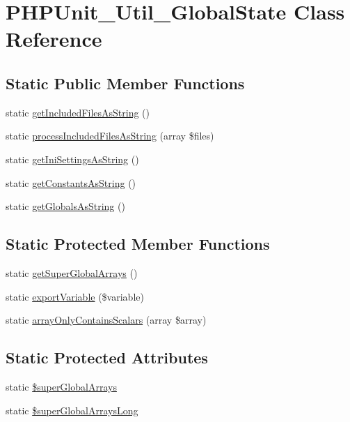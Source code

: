 \hypertarget{class_p_h_p_unit___util___global_state}{}\section{P\+H\+P\+Unit\+\_\+\+Util\+\_\+\+Global\+State Class Reference}
\label{class_p_h_p_unit___util___global_state}
\subsection*{Static Public Member Functions}
\begin{DoxyCompactItemize}
\item 
static \mbox{\hyperlink{class_p_h_p_unit___util___global_state_abc27fa88baf584e0a34b6529f397f290}{get\+Included\+Files\+As\+String}} ()
\item 
static \mbox{\hyperlink{class_p_h_p_unit___util___global_state_a90e12f63ce3df81a029a462cc0b01ddf}{process\+Included\+Files\+As\+String}} (array \$files)
\item 
static \mbox{\hyperlink{class_p_h_p_unit___util___global_state_afb71e18e570bbe1896653880bff7db6d}{get\+Ini\+Settings\+As\+String}} ()
\item 
static \mbox{\hyperlink{class_p_h_p_unit___util___global_state_ae53dadd0f7682fac99d4882017936caa}{get\+Constants\+As\+String}} ()
\item 
static \mbox{\hyperlink{class_p_h_p_unit___util___global_state_a54b637f53d26c8b49f86c515d0673159}{get\+Globals\+As\+String}} ()
\end{DoxyCompactItemize}
\subsection*{Static Protected Member Functions}
\begin{DoxyCompactItemize}
\item 
static \mbox{\hyperlink{class_p_h_p_unit___util___global_state_a0f75e557fb425f0a8d188e947444673d}{get\+Super\+Global\+Arrays}} ()
\item 
static \mbox{\hyperlink{class_p_h_p_unit___util___global_state_ac031d17b391eb264a00d30b0ca8f094e}{export\+Variable}} (\$variable)
\item 
static \mbox{\hyperlink{class_p_h_p_unit___util___global_state_ac49571490c9da3d0d2dee8ceec67b98e}{array\+Only\+Contains\+Scalars}} (array \$array)
\end{DoxyCompactItemize}
\subsection*{Static Protected Attributes}
\begin{DoxyCompactItemize}
\item 
static \mbox{\hyperlink{class_p_h_p_unit___util___global_state_a2472bcf697bff5dbbdd45ecabd4fdf65}{\$super\+Global\+Arrays}}
\item 
static \mbox{\hyperlink{class_p_h_p_unit___util___global_state_a38e2341978642abbcca86d64f6da5c25}{\$super\+Global\+Arrays\+Long}}
\end{DoxyCompactItemize}


